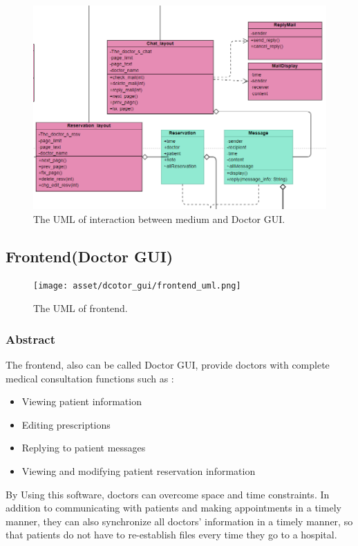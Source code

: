 \documentclass{article}
\begin{document}
\begin{figure}[h]
  \centering
  \includegraphics[scale = 0.5]{asset/frontend_and_medium/MED_usage_doctor_gui.png}
  \caption{The UML of interaction between medium and Doctor GUI.}
  \label{fig:uml_medium_and_doctor_gui}
\end{figure}

\subsection*{Frontend(Doctor GUI)}

\begin{figure}[h]
    \centering
    \texttt{[image: asset/dcotor\_gui/frontend\_uml.png]}
    \caption{The UML of frontend.}
    \label{fig:frontend_uml}
  \end{figure}

\subsubsection*{Abstract}
The frontend, also can be called Doctor GUI, provide doctors with complete medical consultation functions such as :

\begin{itemize}
    \item Viewing patient information
    \item Editing prescriptions
    \item Replying to patient messages
    \item Viewing and modifying patient reservation information
\end{itemize}

By Using this software, doctors can overcome space and time constraints. In addition to communicating with patients and making appointments in a timely manner, they can also synchronize all doctors' information in a timely manner, so that patients do not have to re-establish files every time they go to a hospital.
\end{document}
